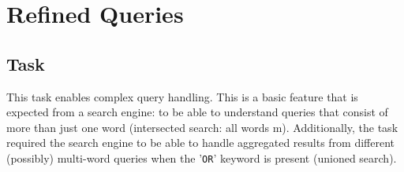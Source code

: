 \chapter{Refined Queries}



\section{Task} %
This task enables complex query handling. This is a basic feature that is expected from a search engine: to be able to understand queries that consist of more than just one word (intersected search: all words m). Additionally, the task required the search engine to be able to handle aggregated results from different (possibly) multi-word queries when the '{\tt OR}' keyword is present (unioned search).

